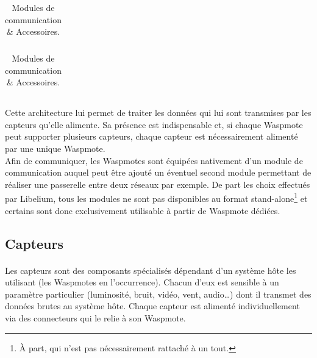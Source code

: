     
        \begin{table}[h] 
            \centering
            \begin{tabular}[t]{l | l}
                
            \end{tabular}
            \hspace{1cm}
            \centering
            \begin{tabular}[t]{l | l}
                
            \end{tabular}
            \caption{Modules de communication \& Accessoires.}
            \label{tab:modules}
        \end{table}

        \paragraph{}Cette architecture lui permet de traiter les données qui lui sont transmises par les capteurs qu'elle alimente. Sa présence est indispensable et, si chaque Waspmote peut supporter plusieurs capteurs, chaque capteur est nécessairement alimenté par une unique Waspmote.\\
        Afin de communiquer, les Waspmotes sont équipées nativement d'un module de communication auquel peut être ajouté un éventuel second module permettant de réaliser une passerelle entre deux réseaux par exemple. De part les choix effectués par Libelium, tous les modules ne sont pas disponibles au format stand-alone\footnote{À part, qui n'est pas nécessairement rattaché à un tout.} et certains sont donc exclusivement utilisable à partir de Waspmote dédiées.


    \subsection{Capteurs}
        \paragraph{}Les capteurs sont des composants spécialisés dépendant d'un système hôte les utilisant (les Waspmotes en l'occurrence). Chacun d'eux est sensible à un paramètre particulier (luminosité, bruit, vidéo, vent, audio\dots) dont il transmet des données brutes au système hôte. Chaque capteur est alimenté individuellement via des connecteurs qui le relie à son Waspmote.
        
